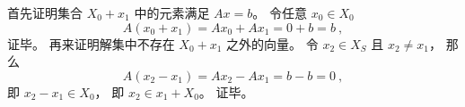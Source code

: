 首先证明集合 $X_0 + x_1$ 中的元素满足 $Ax = b$。 令任意 $x_0 \in X_0$
\begin{equation}
A(x_0 + x_1) = Ax_0 + Ax_1 = 0 + b = b~,
\end{equation}
证毕。 再来证明解集中不存在 $X_0 + x_1$ 之外的向量。 令 $x_2 \in X_S$ 且 $x_2 \ne x_1$， 那么
\begin{equation}
A(x_2 - x_1) = Ax_2 - Ax_1 = b - b = 0~,
\end{equation}
即 $x_2 - x_1 \in X_0$， 即 $x_2 \in x_1 + X_0$。 证毕。


